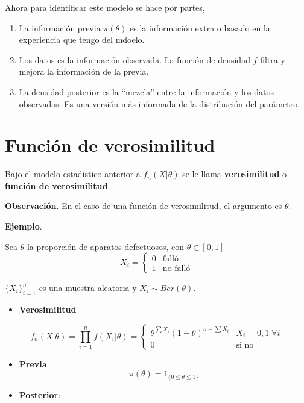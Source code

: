 \documentclass[
  12pt,
]{book}
\providecommand{\tightlist}{%
  \setlength{\itemsep}{0pt}\setlength{\parskip}{0pt}}
\begin{document}
Ahora para identificar este modelo se hace por partes,

\begin{enumerate}
\def\labelenumi{\arabic{enumi}.}
\tightlist
\item
  La información previa \(\pi(\theta)\) es la información extra o basado en la
  experiencia que tengo del mdoelo.
\item
  Los datos es la información observada. La función de densidad \(f\) filtra y
  mejora la información de la previa.
\item
  La densidad posterior es la ``mezcla'' entre la información y los datos
  observados. Es una versión más informada de la distribución del parámetro.
\end{enumerate}

\hypertarget{funciuxf3n-de-verosimilitud}{%
\section{Función de verosimilitud}\label{funciuxf3n-de-verosimilitud}}

Bajo el modelo estadístico anterior a \(f_n(X|\theta)\) se le llama \textbf{verosimilitud} o \textbf{función de verosimilitud}.

\textbf{Observación}. En el caso de una función de verosimilitud, el argumento es \(\theta\).

\textbf{Ejemplo}.

Sea \(\theta\) la proporción de aparatos defectuosos, con \(\theta \in [0,1]\)
\[ X_i = \begin{cases}
 0 & \text{falló} \\
 1 & \text{no falló}
 \end{cases}\]

\(\{X_i\}_{i=1}^n\) es una muestra aleatoria y \(X_i \sim Ber(\theta)\).

\begin{itemize}
\tightlist
\item
  \textbf{Verosimilitud}
\end{itemize}

\[ f_n(X|\theta) = \prod_{i=1}^n f(X_i|\theta) = \begin{cases}\theta^{\sum X_i}(1-\theta)^{n-\sum X_i} & X_i = 0,1\; \forall i\\ 0 & \text{si no}\end{cases}\]

\begin{itemize}
\item
  \textbf{Previa}:
  \[\pi(\theta) = 1_{\{0\leq\theta\leq 1\}}\]
\item
  \textbf{Posterior}:
\end{itemize}
\end{document}
